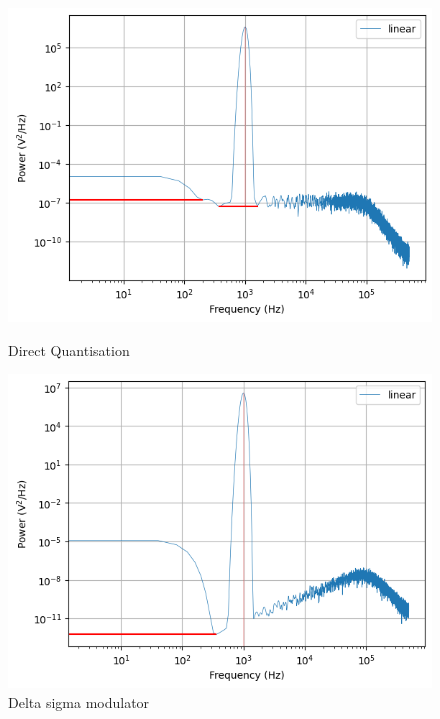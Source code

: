 \documentclass[a4paper]{article}
\begin{document}
\begin{figure}[!h]
	\centering
	\begin{minipage}{0.45\linewidth}
		\centering
		\includegraphics[scale = 0.58]{mat_plots/psd_plots/direct.png}
		\caption{Direct Quantisation}
        \label{fig:direct_psd}
	\end{minipage}
	\hfil
	\begin{minipage}{0.45\linewidth}
		\centering
		\includegraphics[scale = 0.6]{mat_plots/psd_plots/dsm.png}
		\caption{Delta sigma modulator}
   \label{fig:dsm_psd}
	\end{minipage}
\end{figure}
\end{document}

